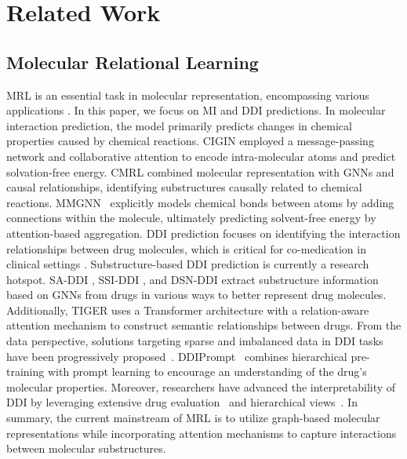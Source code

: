 \section{Related Work}
\subsection{Molecular Relational Learning}
MRL is an essential task in molecular representation, encompassing various applications \cite{pei2024hagoAAAI,du2024mmgnnIJCAI,chen2024uncovering}. 
In this paper, we focus on MI and DDI predictions. 
In molecular interaction prediction, the model primarily predicts changes in chemical properties caused by chemical reactions. CIGIN \cite{cigin} employed a message-passing network and collaborative attention to encode intra-molecular atoms and predict solvation-free energy. 
CMRL \cite{lee2023shiftKDD} combined molecular representation with GNNs and causal relationships, identifying substructures causally related to chemical reactions. MMGNN~\cite{du2024mmgnnIJCAI} explicitly models chemical bonds between atoms by adding connections within the molecule, ultimately predicting solvent-free energy by attention-based aggregation.
DDI prediction focuses on identifying the interaction relationships between drug molecules, which is critical for co-medication in clinical settings \cite{wu2024mkgaaai}. 
Substructure-based DDI prediction is currently a research hotspot. 
SA-DDI \cite{saddi}, SSI-DDI \cite{ssiddi}, and DSN-DDI \cite{dsn} extract substructure information based on GNNs from drugs in various ways to better represent drug molecules. Additionally, TIGER \cite{zhang2024heterogeneousIJCAI} uses a Transformer architecture with a relation-aware attention mechanism to construct semantic relationships between drugs. From the data perspective, solutions targeting sparse and imbalanced data in DDI tasks have been progressively proposed~\cite{ddidata,xiang2024molecularnc}. DDIPrompt~\cite{ddidata} combines hierarchical pre-training with prompt learning to encourage an understanding of the drug's molecular properties. Moreover, researchers have advanced the interpretability of DDI by leveraging extensive drug evaluation~\cite{zhong2024learningnmi} and hierarchical views~\cite{HTCL}. In summary, the current mainstream of MRL is to utilize graph-based molecular representations while incorporating attention mechanisms to capture interactions between molecular substructures.

